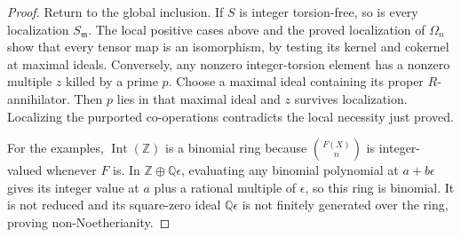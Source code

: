 \begin{proof}
Return to the global inclusion. If $S$ is integer torsion-free, so is
every localization $S_{\mathfrak m}$. The local positive cases above
and the proved localization of $\Omega_n$ show that every tensor map
is an isomorphism, by testing its kernel and cokernel at maximal ideals.
Conversely, any nonzero integer-torsion element has a nonzero multiple
$z$ killed by a prime $p$. Choose a maximal ideal containing its proper
$R$-annihilator. Then $p$ lies in that maximal ideal and $z$ survives
localization. Localizing the purported co-operations contradicts the
local necessity just proved.

For the examples, $\operatorname{Int}(\mathbb Z)$ is a binomial ring
because $\binom{F(X)}n$ is integer-valued whenever $F$ is.
In $\mathbb Z\oplus\mathbb Q\epsilon$, evaluating any binomial polynomial
at $a+b\epsilon$ gives its integer value at $a$ plus a rational multiple
of $\epsilon$, so this ring is binomial. It is not reduced and its
square-zero ideal $\mathbb Q\epsilon$ is not finitely generated over
the ring, proving non-Noetherianity.
\end{proof}

